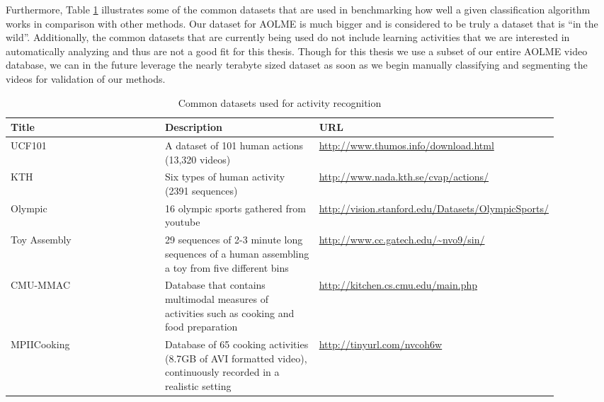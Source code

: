 Furthermore, Table \ref{tab:common_datasets} illustrates some of the common datasets
that are used in benchmarking how well a given classification algorithm works in
comparison with other methods. Our dataset for AOLME is much bigger and is considered
to be truly a dataset that is ``in the wild''. Additionally, the common datasets
that are currently being used do not include learning activities that we are interested
in automatically analyzing and thus are not a good fit for this thesis. Though
for this thesis we  use a subset of our entire AOLME video database, we can in the future
leverage the nearly terabyte sized dataset as soon as we begin manually classifying
and segmenting the videos for validation of our methods.

\begin{singlespace}
  \begin{table}[h]
  \begin{centering}
    \begin{tabular}{ | p{0.3\linewidth} | p{0.3\linewidth} | p{0.3\linewidth} |  }
      \hline
      \textbf{Title} & \textbf{Description} & \textbf{URL} \\
      \hline
      UCF101 \cite{soomro2012ucf101}& A dataset of 101 human actions (13,320 videos) &
      \url{http://www.thumos.info/download.html} \\
      \hline
      KTH & Six types of human activity (2391 sequences) & \url{http://www.nada.kth.se/cvap/actions/} \\
      \hline
      Olympic \cite{niebles2010modeling} & 16 olympic sports gathered from youtube &
       \url{http://vision.stanford.edu/Datasets/OlympicSports/} \\
      \hline
      Toy Assembly \cite{vo2014stochastic} & 29 sequences of 2-3 minute long sequences
      of a human assembling a toy from five different bins & \url{http://www.cc.gatech.edu/~nvo9/sin/} \\
      \hline
      CMU-MMAC \cite{spriggs2009temporal} & Database that contains multimodal measures of activities such as
      cooking and food preparation & \url{http://kitchen.cs.cmu.edu/main.php} \\
      \hline
      MPIICooking \cite{rohrbach2012database} & Database of 65 cooking activities (8.7GB of AVI formatted video),
      continuously recorded in a realistic setting & \url{http://tinyurl.com/nvcoh6w} \\
      \hline
    \end{tabular}
    \caption{Common datasets used for activity recognition}
    \label{tab:common_datasets}
  \end{centering}
\end{table}
\end{singlespace}
